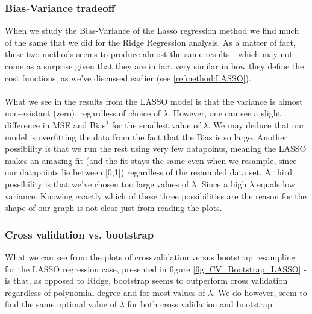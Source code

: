 \documentclass[../main.tex]{subfiles}
\begin{document}
\subsubsection{Bias-Variance tradeoff}
When we study the Bias-Variance of the Lasso regression method we find much of the same that we did for the Ridge Regression analysis. As a matter of fact, these two methods seems to produce almost the same results - which may not come as a surprise given that they are in fact very similar in how they define the cost functions, as we've discussed earlier (see \eqref{refmethod:LASSO}). \\ \\\indent What we see in the results from the LASSO model is that the variance is almost non-existant (zero), regardless of choice of $\lambda$. However, one can see a slight difference in MSE and Bias$^2$ for the smallest value of $\lambda$. We may deduce that our model is overfitting the data from the fact that the Bias is so large. Another possibility is that we run the rest using very few datapoints, meaning the LASSO makes an amazing fit (and the fit stays the same even when we resample, since our datapoints lie between [0,1]) regardless of the resampled data set. A third possibility is that we've chosen too large values of $\lambda$. Since a high $\lambda$ equals low variance. Knowing exactly which of these three possibilities are the reason for the shape of our graph is not clear just from reading the plots.

\subsubsection{Cross validation vs. bootstrap}
What we can see from the plots of crossvalidation versus bootstrap resampling for the LASSO regression case, presented in figure \eqref{fig: CV_Bootstrap_LASSO} - is that, as opposed to Ridge, bootstrap seems to outperform cross validation regardless of polynomial degree and for most values of $\lambda$. We do however, seem to find the same optimal value of $\lambda$ for both cross validation and bootstrap.
\end{document}
